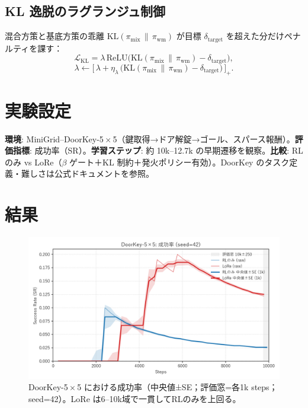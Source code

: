 \documentclass[a4paper,12pt]{article}
\begin{document}
\subsection{KL 逸脱のラグランジュ制御}
混合方策と基底方策の乖離 $\mathrm{KL}(\pi_{\mathrm{mix}}\,\|\,\pi_{\mathrm{wm}})$ が目標 $\delta_{\mathrm{target}}$ を超えた分だけペナルティを課す：
\begin{equation}\label{eq:kl}
\mathcal{L}_{\mathrm{KL}}=\lambda\,\mathrm{ReLU}\bigl(\mathrm{KL}(\pi_{\mathrm{mix}}\,\|\,\pi_{\mathrm{wm}})-\delta_{\mathrm{target}}\bigr),
\end{equation}
\begin{equation}\label{eq:lambda}
\lambda \leftarrow \bigl[\,\lambda + \eta_\lambda\,\bigl(\mathrm{KL}(\pi_{\mathrm{mix}}\,\|\,\pi_{\mathrm{wm}})-\delta_{\mathrm{target}}\bigr)\,\bigr]_+.
\end{equation}

\section{実験設定}
\textbf{環境}: MiniGrid--DoorKey-5\,$\times$\,5（鍵取得→ドア解錠→ゴール、スパース報酬）。\textbf{評価指標}: 成功率（SR）。\textbf{学習ステップ}: 約 10k--12.7k の早期遷移を観察。\textbf{比較}: RL のみ vs LoRe（$\beta$ ゲート＋KL 制約＋発火ポリシー有効）。DoorKey のタスク定義・難しさは公式ドキュメントを参照\citep{minigrid_doorkey}。

\section{結果}

\begin{figure}[H]
  \centering
  \includegraphics[width=\linewidth]{sr_compare.png}
  \caption{DoorKey-5\,$\times$\,5 における成功率（中央値±SE；評価窓=各1k steps；seed=42）。LoRe は6--10k域で一貫してRLのみを上回る。}
  \label{fig:sr}
\end{figure}
\end{document}
